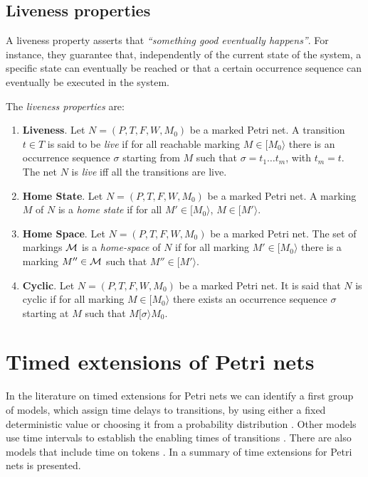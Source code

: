 
\subsection{Liveness properties}
A liveness property asserts that \emph{``something good eventually happens''}.
For instance, they guarantee that, independently of the current state of the system,
a specific state can eventually be reached or that a certain occurrence sequence can eventually
be executed in the system.

The \emph{liveness properties} are:
\begin{enumerate}
\item {\bf Liveness}.
Let $N=(P,T,F,W,M_0)$ be a marked Petri net. A transition $t \in T$
is said to be {\it live} if for all reachable marking $M \in
[ M_0 \rangle$ there is an occurrence sequence $\sigma$ starting from $M$ such that
$\sigma = t_1 \ldots t_m$, with $t_m = t$. The net $N$ is {\it live} iff all the transitions are live.
\item {\bf Home State}.
Let $N=(P,T,F,W,M_0)$ be a marked Petri net. A marking $M$ of $N$ is a {\it home state} if for all
$M' \in [ M_0 \rangle$, $M \in [ M' \rangle$.
\item {\bf Home Space}. Let $N=(P,T,F,W,M_0)$ be a marked Petri net.
The set of markings ${\cal M}$ is a {\it home-space}
of $N$ if for all marking $M' \in [ M_0 \rangle$ there is a marking
$M'' \in {\cal M}$ such that $M'' \in [ M' \rangle$.
\item {\bf Cyclic}.
Let $N=(P,T,F,W,M_0)$ be a marked Petri net. It is said that
$N$ is cyclic if for all marking $M \in [ M_0 \rangle$ there exists an occurrence sequence $\sigma$
starting at $M$ such that $M [ \sigma \rangle M_0$.
\end{enumerate}





\section{Timed extensions of Petri nets}

In the
literature on timed extensions for Petri nets we can identify a
first group of models, which assign time delays to transitions,
by using either a fixed deterministic value
\cite{Ram74,Sif77,VFC93} or choosing it from a probability
distribution \cite{AjCh85}. Other models use time intervals to
establish the enabling times of transitions \cite{Mer74}. 
There are also models that include time on tokens
\cite{van93,van95,BLT90}. In \cite{Bow96,Wan98} 
a summary of time extensions for Petri nets is presented.




